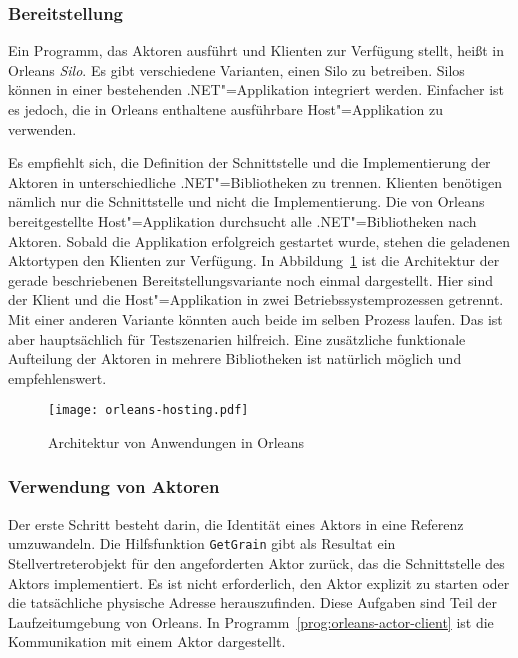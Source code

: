 \subsubsection{Bereitstellung}

Ein Programm, das Aktoren ausführt und Klienten zur Verfügung stellt, heißt in Orleans \textit{Silo}. Es gibt verschiedene Varianten, einen Silo zu betreiben. Silos können in einer bestehenden .NET"=Applikation integriert werden. Einfacher ist es jedoch, die in Orleans enthaltene ausführbare Host"=Applikation zu verwenden. 

Es empfiehlt sich, die Definition der Schnittstelle und die Implementierung der Aktoren in unterschiedliche .NET"=Bibliotheken zu trennen. Klienten benötigen nämlich nur die Schnittstelle und nicht die Implementierung. Die von Orleans bereitgestellte Host"=Applikation durchsucht alle .NET"=Bibliotheken nach Aktoren. Sobald die Applikation erfolgreich gestartet wurde, stehen die geladenen Aktortypen den Klienten zur Verfügung. In Abbildung~\ref{fig:orleans-arch} ist die Architektur der gerade beschriebenen Bereitstellungsvariante noch einmal dargestellt. Hier sind der Klient und die Host"=Applikation in zwei Betriebssystemprozessen getrennt. Mit einer anderen Variante könnten auch beide im selben Prozess laufen. Das ist aber hauptsächlich für Testszenarien hilfreich. Eine zusätzliche funktionale Aufteilung der Aktoren in mehrere Bibliotheken ist natürlich möglich und empfehlenswert. 

\begin{figure}[!hbt]%
\texttt{[image: orleans-hosting.pdf]}%
\caption{Architektur von Anwendungen in Orleans}%
\label{fig:orleans-arch}%
\end{figure}

\subsubsection{Verwendung von Aktoren}

Der erste Schritt besteht darin, die Identität eines Aktors in eine Referenz umzuwandeln. Die Hilfsfunktion \lstinline{GetGrain} gibt als Resultat ein Stellvertreterobjekt für den angeforderten Aktor zurück, das die Schnittstelle des Aktors implementiert. Es ist nicht erforderlich, den Aktor explizit zu starten oder die tatsächliche physische Adresse herauszufinden. Diese Aufgaben sind Teil der Laufzeitumgebung von Orleans. In Programm~\ref{prog:orleans-actor-client} ist die Kommunikation mit einem Aktor dargestellt.

